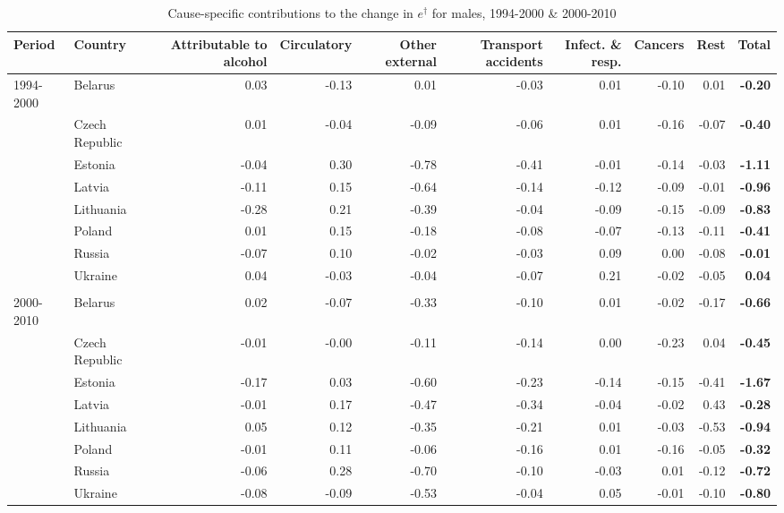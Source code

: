 \documentclass{article}
\begin{document}
\begin{landscape}
\begin{table}
\centering
\caption{Cause-specific contributions to the change in $e^\dagger$ for males, 1994-2000 \& 2000-2010}
\label{T2}
\begin{tabular}{llrrrrrrr>{\bfseries}r}
  \hline
Period & Country & Attributable to alcohol & Circulatory & Other external & Transport accidents & Infect. \& resp.  & Cancers & Rest & Total \\ 
  \hline
  \rowcolor{gray!50}
1994-2000 & Belarus & 0.03 & -0.13 & 0.01 & -0.03 & 0.01 & -0.10 & 0.01 & -0.20 \\ 
   & Czech Republic & 0.01 & -0.04 & -0.09 & -0.06 & 0.01 & -0.16 & -0.07 & -0.40 \\ 
   & Estonia & -0.04 & 0.30 & -0.78 & -0.41 & -0.01 & -0.14 & -0.03 & -1.11 \\ 
   & Latvia & -0.11 & 0.15 & -0.64 & -0.14 & -0.12 & -0.09 & -0.01 & -0.96 \\ 
   & Lithuania & -0.28 & 0.21 & -0.39 & -0.04 & -0.09 & -0.15 & -0.09 & -0.83 \\ 
   & Poland & 0.01 & 0.15 & -0.18 & -0.08 & -0.07 & -0.13 & -0.11 & -0.41 \\ 
   & Russia & -0.07 & 0.10 & -0.02 & -0.03 & 0.09 & 0.00 & -0.08 & -0.01 \\ 
   & Ukraine & 0.04 & -0.03 & -0.04 & -0.07 & 0.21 & -0.02 & -0.05 & 0.04 \\
 & & & & & & & & & \\
    \hline
      \rowcolor{gray!50}
 2000-2010 & Belarus & 0.02 & -0.07 & -0.33 & -0.10 & 0.01 & -0.02 & -0.17 & -0.66 \\ 
   & Czech Republic & -0.01 & -0.00 & -0.11 & -0.14 & 0.00 & -0.23 & 0.04 & -0.45 \\ 
   & Estonia & -0.17 & 0.03 & -0.60 & -0.23 & -0.14 & -0.15 & -0.41 & -1.67 \\ 
   & Latvia & -0.01 & 0.17 & -0.47 & -0.34 & -0.04 & -0.02 & 0.43 & -0.28 \\ 
   & Lithuania & 0.05 & 0.12 & -0.35 & -0.21 & 0.01 & -0.03 & -0.53 & -0.94 \\ 
   & Poland & -0.01 & 0.11 & -0.06 & -0.16 & 0.01 & -0.16 & -0.05 & -0.32 \\ 
   & Russia & -0.06 & 0.28 & -0.70 & -0.10 & -0.03 & 0.01 & -0.12 & -0.72 \\ 
   & Ukraine & -0.08 & -0.09 & -0.53 & -0.04 & 0.05 & -0.01 & -0.10 & -0.80 \\ 
   \hline
\end{tabular}

\end{table}
\end{landscape}
\end{document}
